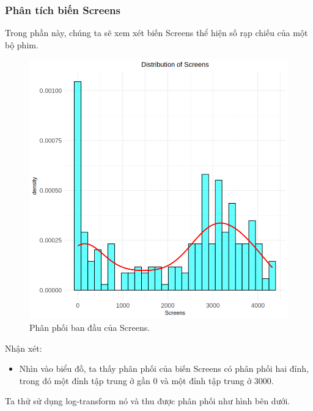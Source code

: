 \subsubsection{Phân tích biến Screens}

Trong phần này, chúng ta sẽ xem xét biến Screens thể hiện số rạp chiếu của một bộ phim.

\begin{figure}[H]
    \centering
    \includegraphics[width=0.75\columnwidth]{csm_figures/screens_original_distribution.png}
    \caption{Phân phối ban đầu của Screens.}
    \label{fig:screens_original_distribution}
\end{figure}

Nhận xét:
\begin{itemize}
    \item Nhìn vào biểu đồ, ta thấy phân phối của biến Screens có phân phối hai đỉnh, trong đó một đỉnh tập trung ở gần 0 và một đỉnh tập trung ở 3000.
\end{itemize}

Ta thử sử dụng log-transform nó và thu được phân phối như hình bên dưới.

